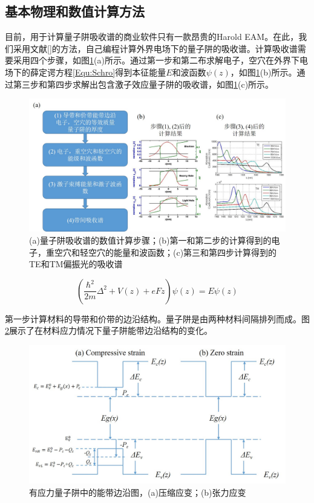 \subsection{基本物理和数值计算方法}
目前，用于计算量子阱吸收谱的商业软件只有一款昂贵的Harold EAM\cite{HarolEAM}。在此，我们采用文献[]的方法，自己编程计算外界电场下的量子阱的吸收谱。计算吸收谱需要采用四个步骤，如图\ref{fig_ch2_flow_chart}(a)所示。通过第一步和第二布求解电子，空穴在外界下电场下的薛定谔方程\ref{Equ:Schro}得到本征能量$E$和波函数$\psi(z)$，如图\ref{fig_ch2_flow_chart}(b)所示。通过第三步和第四步求解出包含激子效应量子阱的吸收谱，如图\ref{fig_ch2_flow_chart}(c)所示。
\begin{figure}[htb]
	\centering
	\includegraphics[width=16cm]{./Pictures/fig_ch2_flow_chart.jpg}
	\caption{(a)量子阱吸收谱的数值计算步骤；(b)第一和第二步的计算得到的电子，重空穴和轻空穴的能量和波函数；(c)第三和第四步计算得到的TE和TM偏振光的吸收谱}
	\label{fig_ch2_flow_chart}
\end{figure}

\begin{equation}
\label{Equ:Schro}
(\frac{\hbar^2}{2m}\Delta^2+V(z)+eFz)\psi(z)=E\psi(z)
\end{equation}

第一步计算材料的导带和价带的边沿结构。量子阱是由两种材料间隔排列而成。图\ref{fig_ch2_band_diagram}展示了在材料应力情况下量子阱能带边沿结构的变化\cite{chuang1995physics}。

\begin{figure}[htb]
	\centering
	\includegraphics[width=14cm]{./Pictures/fig_ch2_band_diagram.jpg}
	\caption{有应力量子阱中的能带边沿图，(a)压缩应变；(b)张力应变}
	\label{fig_ch2_band_diagram}
\end{figure}


